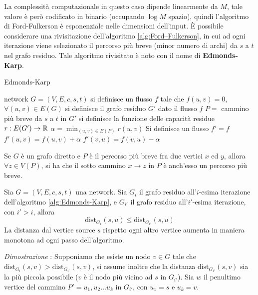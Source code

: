 \documentclass[10pt, letterpaper]{report}
\begin{document}
La complessità computazionale in questo caso dipende linearmente da $M$, tale valore è però codificato in binario (occupando $\log M$ spazio), quindi l'algoritmo di Ford-Fulkerson è esponenziale nelle dimensioni dell'input. È possibile considerare una rivisitazione dell'algoritmo \ref{alg:Ford–Fulkerson}, in cui ad ogni iterazione viene selezionato il percorso più breve (minor numero di archi) da $s$ a $t$ nel grafo residuo. Tale algoritmo rivisitato è noto con il nome di \textbf{Edmonds-Karp}.
\begin{algorithm}
    \caption{Edmonds-Karp}\label{alg:Edmonds-Karp}
    \begin{algorithmic}
    \Require network $G=(V,E,c,s,t)$
    \State si definisce un flusso $f$ tale che $f(u,v)=0$, $\forall (u,v)\in E(G)$
    \State si definisce il grafo residuo $G'$ dato il flusso $f$
    \State $P=$ cammino più breve da $s$ a $t$ in $G'$ 
    \State si definisce la funzione delle capacità residue $r:E(G')\rightarrow {\mathbb R}$
    \State $\displaystyle\alpha=\min_{(u,v)\in E(P)}r(u,v)$
    \State Si definisce un flusso $f'=f$
    \State $f'(u,v)=f(u,v)+\alpha$
    \State $f'(v,u)=f(v,u)-\alpha$
    \EndFor
    \EndWhile
    \end{algorithmic}
    \end{algorithm}
\begin{osservazione}
    Se $G$ è un grafo diretto e $P$ è il percorso più breve fra due vertici $x$ ed $y$, allora $\forall z \in V(P)$, si ha che il sotto cammino $x\rightarrow z$ in $P$ è anch'esso un percorso più breve.
\end{osservazione}
\begin{proposizione}\label{monotoningIncreasing}
    Sia $G=(V,E,c,s,t)$ una network. Sia $G_i$ il grafo residuo all'$i$-esima iterazione dell'algoritmo \ref{alg:Edmonds-Karp}, e $G_{i'}$ il grafo residuo all'$i'$-esima iterazione, con $i'>i$, allora
    \begin{equation} \text{dist}_{G_i}(s,u)\le \text{dist}_{G_{i'}}(s,u)\end{equation}
    La distanza dal vertice source $s$ rispetto ogni altro vertice aumenta in maniera monotona ad ogni passo dell'algoritmo.
\end{proposizione}
\textit{Dimostrazione} : Supponiamo che esiste un nodo $v\in G$ tale che  
$ \text{dist}_{G_i}(s,v)>\text{dist}_{G_{i'}}(s,v)$, si assume inoltre che la distanza $\text{dist}_{G_{i'}}(s,v)$ sia la più piccola possibile ($v$ è il nodo più vicino ad $s$ in $G_{i'}$). Sia $w$ il penultimo vertice del cammino $P'=u_1,u_2\dots u_k$ in $G_{i'}$, con $u_1=s$ e $u_k=v$.
\end{document}
